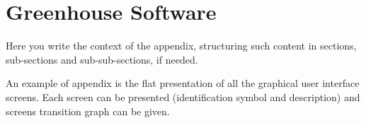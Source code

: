 \chapter{Greenhouse Software}
\label{chap:appendix}

 
Here you write the context of the appendix, structuring such content in
sections, sub-sections and sub-sub-sections, if needed.

An example of appendix is the flat presentation of all the graphical user interface screens.
Each screen can be presented (identification symbol and description) and screens transition graph can be given.































